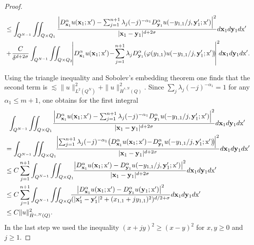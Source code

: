 \documentclass[10pt]{amsart}
\theoremstyle{definition}\newtheorem{defi}[theo]{Definition}\newtheorem{rema}[theo]{Remark}\newtheorem{exam}[theo]{Example}\newtheorem{exem}[theo]{Example}\newtheorem{nota}[theo]{Notation}
\newcommand\1{{\ensuremath {\mathds 1} }}
\newcommand{\bx}{\mathbf{x}}
\newcommand{\by}{\mathbf{y}}
\newcommand{\sx}{\textup{x}}
\begin{document}
\begin{proof}
\begin{multline*}
\begin{aligned}
&\leq
\int_{Q^{N-1}}\iint_{Q\times Q_1} \frac{\left|D^\alpha_{\bx_1} u(\bx_1;\sx')-\sum_{j=1}^{n+1}\lambda_j(-j)^{-\alpha_1} D^\alpha_{\by_1}u(-y_{1,1}/j, \by_1'; \sx')\right|^2}{|\bx_1-\by_1|^{d+2\sigma}}d\bx_1 d\by_1 d\sx'\\
&+\!\frac{C}{\delta^{d+2\sigma}}\int_{Q^{N-1}}\iint_{Q\times Q_2}\!\!\left|D^\alpha_{\bx_1} u(\bx_1;\sx')\!-\!\sum_{j=1}^{n+1}\lambda_j D^\alpha_{\by_1} (\varphi(y_{1,1}) u(-y_{1,1}/j, \by_1'; \sx')\!)\!\right|^2\!\!d\bx_1 d\by_1 d\sx'.
\end{aligned}
\end{multline*}

Using the triangle inequality and Sobolev's embedding theorem one finds that the second term is $\lesssim \|u\|_{L^2(Q^N)}^2+\|u\|_{\dot{H}^{s,N}(Q)}^2$. Since $\sum_{j}\lambda_j (-j)^{-\alpha_1} = 1$ for any\linebreak$\alpha_1\leq m+1$, one obtains for the first integral
\begin{multline*}
\int_{Q^{N-1}}\iint_{Q\times Q_1}\!\frac{\left|D^\alpha_{\bx_1} u(\bx_1;\sx')-\sum_{j=1}^{n+1}\lambda_j(-j)^{-\alpha_1} D^\alpha_{\by_1}u(-y_{1,1}/j, \by_1'; \sx')\right|^2}{|\bx_1-\by_1|^{d+2\sigma}}d\bx_1 d\by_1 d\sx'\\
\begin{aligned}
& =\int_{Q^{N-1}}\iint_{Q\times Q_1}\!\!\frac{\left|\sum_{j=1}^{n+1}\lambda_j(-j)^{-\alpha_1}\!\left(D^\alpha_{\bx_1} u(\bx_1;\sx')\!-\!D^\alpha_{\by_1}u(-y_{1,1}/j, \by_1'; \sx')\!\right)\!\right|^2}{|\bx_1-\by_1|^{d+2\sigma}}d\bx_1 d\by_1 d\sx'\\
& \leq C\sum_{j=1}^{n+1}\int_{Q^{N-1}}\iint_{Q\times Q_1}\!\!\frac{\left|D^\alpha_{\bx_1} u(\bx_1;\sx')-D^\alpha_{\by_1}u(-y_{1,1}/j, \by_1'; \sx')\right|^2}{|\bx_1-\by_1|^{d+2\sigma}}d\bx_1 d\by_1 d\sx'\\
& \leq C\sum_{j=1}^{n+1}\int_{Q^{N-1}}\iint_{Q\times Q}\!\!\frac{\left|D^\alpha_{\bx_1} u(\bx_1;\sx')-D^\alpha_{\by_1}u(\by_1; \sx')\right|^2}{(|\bx_1'-\by_1'|^2+(x_{1,1}+jy_{1,1})^2)^{d/2+\sigma}} d\bx_1 d\by_1 d\sx'\\
&\leq C \|u\|_{\dot{H}^{s,N}(Q)}^2.
\end{aligned}
\end{multline*}
In the last step we used the inequality $(x+jy)^2\geq (x-y)^2$ for $x,y\geq 0$ and $j\geq 1$.



\end{proof}
\end{document}
